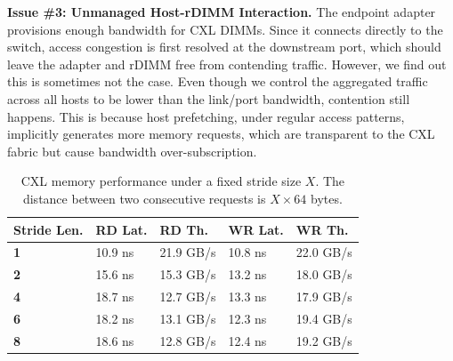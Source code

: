 \noindent
{\bf Issue \#3: Unmanaged Host-rDIMM Interaction.}
The endpoint adapter %
provisions enough bandwidth for CXL DIMMs. Since it connects directly to the switch, access congestion is first resolved at the downstream port, which should leave the adapter and rDIMM free from contending traffic. However, we find out this is sometimes not the case. Even though we control the aggregated traffic across all hosts to be lower than the link/port bandwidth, contention still happens. This is because host prefetching, under regular access patterns,
implicitly generates more memory requests, which are transparent to the CXL fabric but cause bandwidth over-subscription.


\begin{table}[t!]
    \scriptsize
    \begin{tabular}{C{12mm}|| C{11mm} | C{14mm} | C{11mm} | C{14mm}}
    \hline
    \textbf{Stride Len.} & \textbf{RD Lat.} & \textbf{RD Th.} & \textbf{WR Lat.} & \textbf{WR Th.} \\
    \hline
    \textbf{1} & 10.9 ns & 21.9 GB/s & 10.8 ns & 22.0 GB/s \\
    \hline
    \textbf{2} & 15.6 ns & 15.3 GB/s & 13.2 ns & 18.0 GB/s \\
    \hline
    \textbf{4} & 18.7 ns & 12.7 GB/s & 13.3 ns & 17.9 GB/s \\
    \hline
    \textbf{6} & 18.2 ns & 13.1 GB/s & 12.3 ns & 19.4 GB/s \\
    \hline
    \textbf{8} & 18.6 ns & 12.8 GB/s & 12.4 ns & 19.2 GB/s \\
    \hline
    \end{tabular}
    \vspace{-1.0\baselineskip}
    \caption{CXL memory performance under a fixed stride size $X$. The distance between two consecutive requests is $X \times 64$ bytes.}
    \label{tbl:strided-perf}
    \vspace{-0.5\baselineskip}
\end{table}


